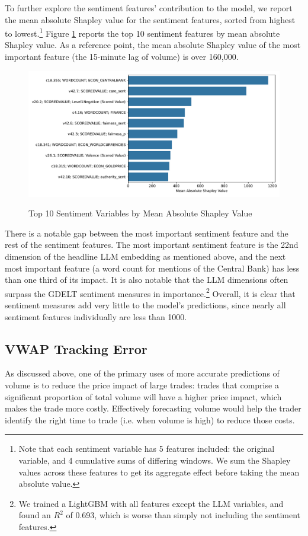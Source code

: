 \documentclass[12pt]{article}
\begin{document}
To further explore the sentiment features' contribution to the model, we report the mean absolute Shapley value for the sentiment features, sorted from highest to lowest.\footnote{Note that each sentiment variable has 5 features included: the original variable, and 4 cumulative sums of differing windows. We sum the Shapley values across these features to get its aggregate effect before taking the mean absolute value.} Figure \ref{fig:shapley_sentiment} reports the top 10 sentiment features by mean absolute Shapley value. As a reference point, the mean absolute Shapley value of the most important feature (the 15-minute lag of volume) is over 160,000.
\begin{figure}[H]
    \centering
    \caption{Top 10 Sentiment Variables by Mean Absolute Shapley Value}
    \includegraphics[width=0.75\linewidth]{../Output/shap_sentiment_contributions.pdf}
    \label{fig:shapley_sentiment}
\end{figure}
There is a notable gap between the most important sentiment feature and the rest of the sentiment features. The most important sentiment feature is the 22nd dimension of the headline LLM embedding as mentioned above, and the next most important feature (a word count for mentions of the Central Bank) has less than one third of its impact. It is also notable that the LLM dimensions often surpass the GDELT sentiment measures in importance.\footnote{We trained a LightGBM with all features except the LLM variables, and found an $R^2$ of 0.693, which is worse than simply not including the sentiment features.} Overall, it is clear that sentiment measures add very little to the model's predictions, since nearly all sentiment features individually are less than 1000.

\subsection{VWAP Tracking Error}
As discussed above, one of the primary uses of more accurate predictions of volume is to reduce the price impact of large trades: trades that comprise a significant proportion of total volume will have a higher price impact, which makes the trade more costly. Effectively forecasting volume would help the trader identify the right time to trade (i.e. when volume is high) to reduce those costs.
\end{document}
